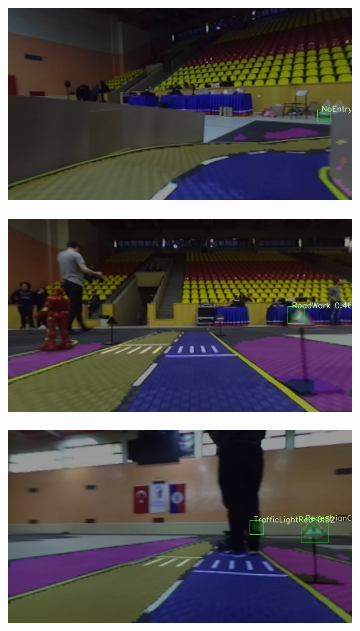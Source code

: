 \begin{figure}[h]
\begin{subfigure}[b]{0.45\linewidth}
  \end{subfigure}
  \begin{subfigure}[b]{0.45\linewidth}
    \includegraphics[width=\linewidth]{figures/experiments/real/fp-noentry3.jpg}
  \end{subfigure}
  \begin{subfigure}[b]{0.45\linewidth}
    \includegraphics[width=\linewidth]{figures/experiments/real/fp-roadwork.jpg}
  \end{subfigure}
  \begin{subfigure}[b]{0.45\linewidth}
    \includegraphics[width=\linewidth]{figures/experiments/real/fp-trafficlight.jpg}

\end{subfigure}
\end{figure}
